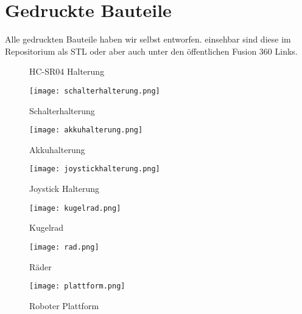 \documentclass[12pt]{article}
\begin{document}
\newpage
\section{Gedruckte Bauteile} %

Alle gedruckten Bauteile haben wir selbst entworfen. einsehbar sind diese im Repositorium als STL oder aber auch unter den öffentlichen Fusion 360 Links.
\newline
\begin{figure}[h]
	\centering 
\caption{HC-SR04 Halterung} 

        \begin{minipage}[t]{0.48\textwidth}
                \texttt{[image: schalterhalterung.png]}
                \caption{Schalterhalterung \cite{Schalterhalterung}}
        \end{minipage}\hfill
        \begin{minipage}[t]{0.48\textwidth}
                \texttt{[image: akkuhalterung.png]}
                \caption{Akkuhalterung \cite{Akkuhalterung}}
        \end{minipage} 
\end{figure}


\begin{figure}
        \centering
        \begin{minipage}[t]{0.48\textwidth}
                \texttt{[image: joystickhalterung.png]}
                \caption{Joystick Halterung \cite{Joystick_Halterung}}
        \end{minipage}\hfill
        \begin{minipage}[t]{0.48\textwidth}
                \texttt{[image: kugelrad.png]}
                \caption{Kugelrad \cite{Kugelrad}}
        \end{minipage}
        \medskip

        \begin{minipage}[t]{0.48\textwidth}
                \texttt{[image: rad.png]}
                \caption{Räder \cite{Raeder}}
        \end{minipage}\hfill
        \begin{minipage}[t]{0.48\textwidth}
                \texttt{[image: plattform.png]}
                \caption{Roboter Plattform \cite{Plattform}}
        \end{minipage}
       
\end{figure}
\end{document}
